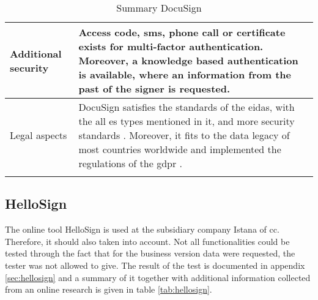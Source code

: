 \begin{longtable}{|p{4cm}|p{10cm}|}
		Additional security & Access code, \gls{sms}, phone call or certificate exists for multi-factor authentication. Moreover, a knowledge based authentication is available, where an information from the past of the signer is requested. \parencite{docusign2018security} \\ \hline
		Legal aspects & DocuSign satisfies the standards of the \gls{eidas}, with the all \gls{es} types mentioned in it, and more security standards \parencite{docusign2018certificates,docusign2018legal,docusign2018es}. Moreover, it fits to the data legacy of most countries worldwide and implemented the regulations of the \gls{gdpr} \parencite{docusign2018global, docusign2018gdpr}. \\ \hline
	\caption{Summary DocuSign}
	\label{tab:docusign}
	\end{longtable}


\subsection{HelloSign}
The online tool HelloSign is used at the subsidiary company Istana of \gls{cc}. Therefore, it should also taken into account. Not all functionalities could be tested through the fact that for the business version data were requested, the tester was not allowed to give. The result of the test is documented in appendix \ref{sec:hellosign} and a summary of it together with additional information collected from an online research is given in table \ref{tab:hellosign}.
	

